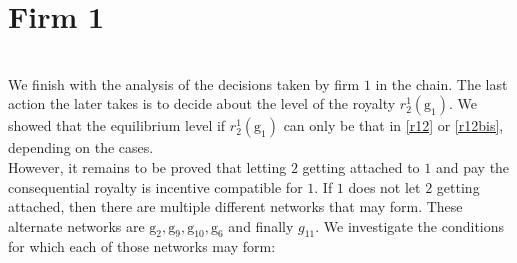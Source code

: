 \documentclass{article}
\begin{document}
\chapter{\textbf{Firm 1}}\\
We finish with the analysis of the decisions taken by firm $1$ in the chain. The last action the later takes is to decide about the level of the royalty $r^1_2(\text{g}_1)$. We showed that the equilibrium level if $r^1_2(\text{g}_1)$ can only be that in \eqref{r12} or \eqref{r12bis}, depending on the cases. \\
\indent However, it remains to be proved that letting $2$ getting attached to $1$ and pay the consequential royalty is incentive compatible for $1$. If $1$ does not let $2$ getting attached, then there are multiple different networks that may form. These alternate networks are $\text{g}_2, \text{g}_9, \text{g}_{10},\text{g}_6$ and finally $g_{11}$. We investigate the conditions for which each of those networks may form: 
\end{document}
